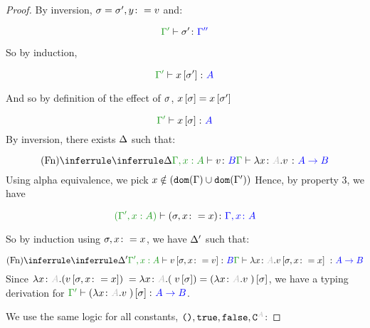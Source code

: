 \documentclass{report}
\begin{document}
\begin{framed}
\begin{proof}
                By inversion, $\sigma = \sigma', y\colon= v$
                and:
        
                \begin{equation}
                    \typerelation{\G'}{\si'}{\G''}
                \end{equation}
        
                So by induction,
        
                \begin{equation}
                    \typerelation{\G'}{x\sub{\si'}}{A}
                \end{equation}
        
                And so by definition of the effect of $\sigma$, $x\left[\sigma\right] = x\left[\sigma'\right]$
        
                \begin{equation}
                    \typerelation{\G'}{x\sub{\si}}{A}
                \end{equation}
            By inversion, there exists $\Delta$ such that:
        
            \begin{equation}
                \ntreeruleI{Fn}{
                    \treeruleI{\D}{\typerelation{\G, x:A }{v}{B}}
                }{\typerelation{\G}{\lam{x}{A}{v}}{\ab}}
            \end{equation}
            Using alpha equivalence, we pick $x\notin(\texttt{dom}(\Gamma)\cup\texttt{dom}(\Gamma'))$
            Hence, by property 3, we have
        
            \begin{equation}
                \typerelation{(\G', x:A )}{(\si, x\setto x)}{\gax}
            \end{equation}
        
            So by induction using $\sigma,x\colon= x$, we have $\Delta'$ such that:
        
            \begin{equation}
                \ntreeruleI{Fn}{
                    \treeruleI{\D'}{\typerelation{\G', x:A }{v\sub{\si, x\setto v}}{B}}
                }{\typerelation{\G}{\lam{x}{A}{v\sub{\si, x\setto{x}}}}{\ab}}
            \end{equation} 
            Since $\lam{x}{A}{(v\sub{\si, x\setto{x}})} = {\lam{x}{A}({v\ssi})} = (\lam{x}{A}{v})\ssi$, we have a typing derivation for $\typerelation{\G'}{(\lam{x}{A}{v})\ssi}{\ab}$.
        
            We use the same logic for all constants, $\u,\t,\f,\const{A}$:
        

\end{proof}
\end{framed}
\end{document}
